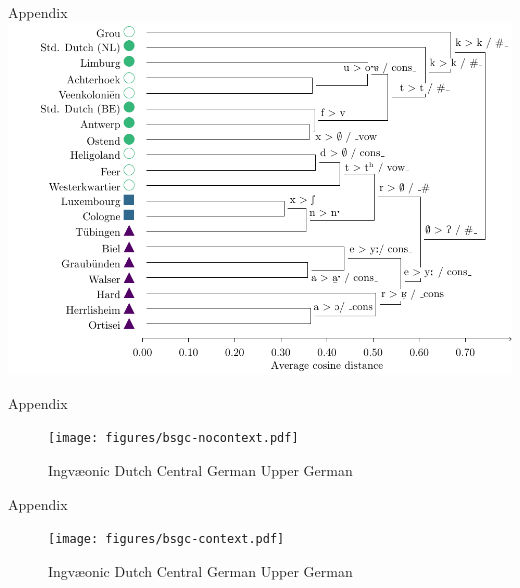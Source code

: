 \documentclass[xcolor={dvipsnames}]{beamer}
\def\upper{\color{purple}\FilledBigTriangleUp}
\def\central{\color{midblue}\FilledBigSquare}
\def\dutch{\color{green}\FilledBigCircle}
\def\ingv{\color{green}\BigCircle}
\begin{document}
\begin{frame}{Appendix}
\includegraphics[width=\textwidth]{figures/tfidf-context.pdf}
\end{frame}

\begin{frame}{Appendix}
\begin{figure}[h]
\centering
\texttt{[image: figures/bsgc-nocontext.pdf]}
\vspace{0.5em}
\begin{center}
\small
{\ingv} Ingv\ae{}onic \hspace{1em}
{\dutch} Dutch \hspace{1em}
{\central} Central German \hspace{1em}
{\upper} Upper German
\end{center}
\end{figure}
\end{frame}

\begin{frame}{Appendix}
\begin{figure}[h]
\centering
\texttt{[image: figures/bsgc-context.pdf]}\\
\vspace{0.5em}
\begin{center}
\small
{\ingv} Ingv\ae{}onic \hspace{1em}
{\dutch} Dutch \hspace{1em}
{\central} Central German \hspace{1em}
{\upper} Upper German
\end{center}
\end{figure}
\end{frame}
\end{document}
